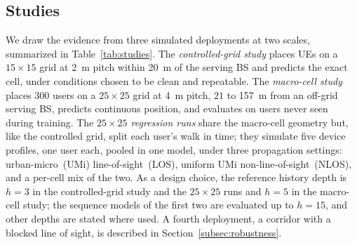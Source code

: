 \subsection{Studies}
\label{subsec:studies}

We draw the evidence from three simulated deployments at two scales, summarized in Table~\ref{tab:studies}. The \emph{controlled-grid study} places UEs on a $15\times15$ grid at \SI{2}{\meter} pitch within \SI{20}{\meter} of the serving BS and predicts the exact cell, under conditions chosen to be clean and repeatable. The \emph{macro-cell study} places $300$ users on a $25\times25$ grid at \SI{4}{\meter} pitch, $21$ to \SI{157}{\meter} from an off-grid serving BS, predicts continuous position, and evaluates on users never seen during training. The \emph{$25\times25$ regression runs} share the macro-cell geometry but, like the controlled grid, split each user's walk in time; they simulate five device profiles, one user each, pooled in one model, under three propagation settings: urban-micro~(UMi) line-of-sight~(LOS), uniform UMi non-line-of-sight~(NLOS), and a per-cell mix of the two. As a design choice, the reference history depth is $h=3$ in the controlled-grid study and the $25\times25$ runs and $h=5$ in the macro-cell study; the sequence models of the first two are evaluated up to $h=15$, and other depths are stated where used. A fourth deployment, a corridor with a blocked line of sight, is described in Section~\ref{subsec:robustness}.

